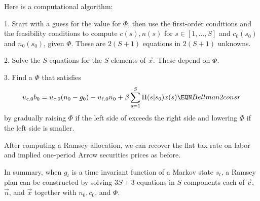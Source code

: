 Here is a computational algorithm:

\medskip

\item{1.} Start with a guess for the value for $\Phi$,  then use the first-order conditions    and the
feasibility conditions 
 to compute $c(s), n(s)$ for  $s \in [1,\ldots , S] $  and
$c_0(s_0)$ and $n_0(s_0)$, given $\Phi$.  These are $2  (S+1)$ equations in $2  (S+1)$ unknowns.

\medskip

\item{2.} Solve the $S$ equations  for the $S$ elements of $\vec x$.  These depend on $\Phi$. %

\medskip

\item{3.}  Find a $\Phi$ that satisfies
$$   u_{c,0} b_0 = u_{c,0} (n_0 - g_0) - u_{\ell,0} n_0  + \beta \sum_{s=1}^S \Pi(s | s_0) x(s) \EQN Bellman2consr $$
 by gradually raising $\Phi$ if the
left side of   exceeds the right side  and lowering $\Phi$ if the left side is smaller.

\medskip

\noindent After computing a Ramsey allocation, we can recover the flat tax rate on labor and implied one-period Arrow securities
prices as before.

%
%



In summary,  when $g_t$ is a time invariant function of a Markov state $s_t$, a Ramsey plan can be constructed
 by solving $3S +3$ equations in $S$ components each of  $\vec c$, $\vec n$, and $\vec x$
together with
$n_0, c_0$, and $\Phi$.












